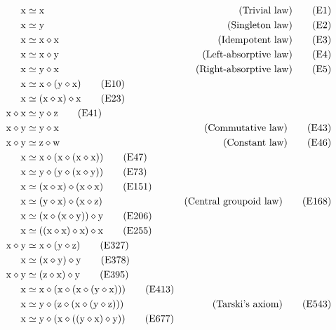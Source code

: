 \begin{align}
    \x &\formaleq \x & \hbox{(Trivial law)} \label{eq1}\tag{E1} \\
    \x &\formaleq \y & \hbox{(Singleton law)} \label{eq2}\tag{E2} \\
    \x &\formaleq \x \op \x & \hbox{(Idempotent law)} \label{eq3}\tag{E3} \\
    \x &\formaleq \x \op \y & \hbox{(Left-absorptive law)} \label{eq4}\tag{E4} \\
    \x &\formaleq \y \op \x & \hbox{(Right-absorptive law)} \label{eq5}\tag{E5} \\
    \x &\formaleq \x \op (\y \op \x) \label{eq10}\tag{E10} \\
    \x &\formaleq (\x \op \x) \op \x \label{eq23}\tag{E23} \\
    \x \op \x &\formaleq \y \op \z \label{eq41}\tag{E41} \\
    \x \op \y &\formaleq \y \op \x & \hbox{(Commutative law)} \label{eq43}\tag{E43} \\
    \x \op \y &\formaleq \z \op \w & \hbox{(Constant law)} \label{eq46}\tag{E46} \\
    \x &\formaleq \x \op (\x \op (\x \op \x)) \label{eq47}\tag{E47} \\
    \x &\formaleq \y \op (\y \op (\x \op \y))  \label{eq73}\tag{E73} \\
    \x &\formaleq (\x \op \x) \op (\x \op \x) \label{eq151}\tag{E151} \\
    \x &\formaleq (\y \op \x) \op (\x \op \z) & \hbox{(Central groupoid law)} \label{eq168}\tag{E168} \\
    \x &\formaleq (\x \op (\x \op \y)) \op \y \label{eq206}\tag{E206} \\
    \x &\formaleq ((\x \op \x) \op \x) \op \x \label{eq255}\tag{E255} \\
    \x \op \y &\formaleq \x \op (\y \op \z) \label{eq327}\tag{E327} \\
    \x &\formaleq (\x \op \y) \op \y \label{eq378}\tag{E378} \\
    \x \op \y &\formaleq (\z \op \x) \op \y \label{eq395}\tag{E395} \\
    \x &\formaleq \x \op (\x \op (\x \op (\y \op \x))) \label{eq413}\tag{E413} \\
    \x &\formaleq \y \op (\z \op (\x \op (\y \op \z))) & \hbox{(Tarski's axiom)} \label{eq543}\tag{E543} \\
    \x &\formaleq \y \op (\x \op ((\y \op \x) \op \y)) \label{eq677}\tag{E677} \\

\end{align}
